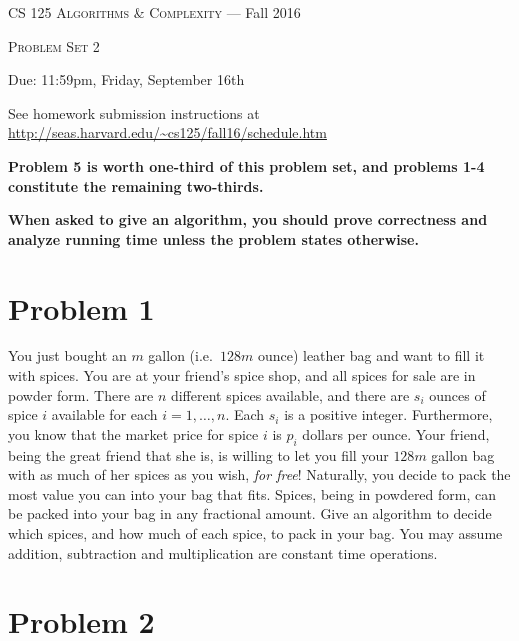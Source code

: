 \documentclass[12pt]{article}
\begin{document}
\thispagestyle{empty}

\begin{center}
{\Large \textsc{CS 125 Algorithms \& Complexity} --- Fall 2016}

\bigskip

{\Large \textsc{Problem Set 2}}

\smallskip

Due: 11:59pm, Friday, September 16th

\bigskip

{\footnotesize See homework submission instructions at \url{http://seas.harvard.edu/~cs125/fall16/schedule.htm}}
\end{center}

\textbf{Problem 5 is worth one-third of this problem set, and problems 1-4 constitute the remaining two-thirds.}

\bigskip

\textbf{When asked to give an algorithm, you should prove correctness and analyze running time unless the problem states otherwise.}

\section*{Problem 1}

You just bought an $m$ gallon (i.e.\ $128m$ ounce) leather bag and want to fill it with spices. You are at your friend's spice shop, and all spices for sale are in powder form. There are $n$ different spices available, and there are $s_i$ ounces of spice $i$ available for each $i=1,\ldots,n$. Each $s_i$ is a positive integer. Furthermore, you know that the market price for spice $i$ is $p_i$ dollars per ounce. Your friend, being the great friend that she is, is willing to let you fill your $128m$ gallon bag with as much of her spices as you wish, {\em for free}! Naturally, you decide to pack the most value you can into your bag that fits. Spices, being in powdered form, can be packed into your bag in any fractional amount. Give an algorithm to decide which spices, and how much of each spice, to pack in your bag. You may assume addition, subtraction and multiplication are constant time operations.

\section*{Problem 2}
\end{document}
